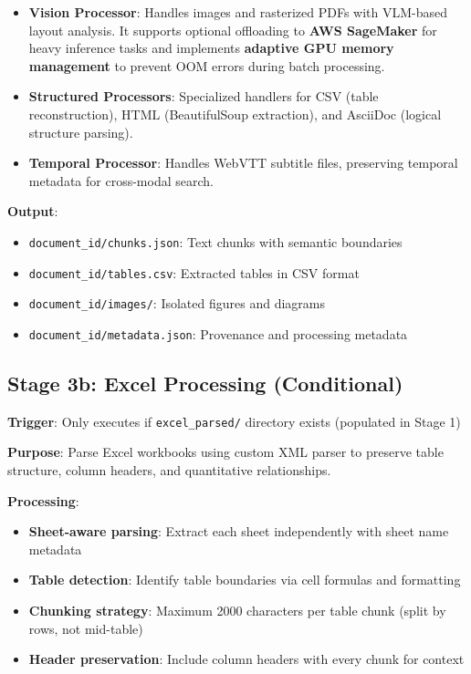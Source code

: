 \begin{itemize}
    \item \textbf{Vision Processor}: Handles images and rasterized PDFs with VLM-based layout analysis. It supports optional offloading to \textbf{AWS SageMaker} for heavy inference tasks and implements \textbf{adaptive GPU memory management} to prevent OOM errors during batch processing.
    \item \textbf{Structured Processors}: Specialized handlers for CSV (table reconstruction), HTML (BeautifulSoup extraction), and AsciiDoc (logical structure parsing).
    \item \textbf{Temporal Processor}: Handles WebVTT subtitle files, preserving temporal metadata for cross-modal search.
\end{itemize}


\textbf{Output}:
\begin{itemize}
    \item \texttt{document\_id/chunks.json}: Text chunks with semantic boundaries
    \item \texttt{document\_id/tables.csv}: Extracted tables in CSV format
    \item \texttt{document\_id/images/}: Isolated figures and diagrams
    \item \texttt{document\_id/metadata.json}: Provenance and processing metadata
\end{itemize}

\subsection{Stage 3b: Excel Processing (Conditional)}

\textbf{Trigger}: Only executes if \texttt{excel\_parsed/} directory exists (populated in Stage 1)

\textbf{Purpose}: Parse Excel workbooks using custom XML parser to preserve table structure, column headers, and quantitative relationships.

\textbf{Processing}:

\begin{itemize}
    \item \textbf{Sheet-aware parsing}: Extract each sheet independently with sheet name metadata
    \item \textbf{Table detection}: Identify table boundaries via cell formulas and formatting
    \item \textbf{Chunking strategy}: Maximum 2000 characters per table chunk (split by rows, not mid-table)
    \item \textbf{Header preservation}: Include column headers with every chunk for context
\end{itemize}

